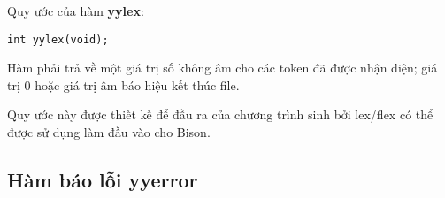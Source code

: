 \documentclass[../report.tex]{subfiles}
\begin{document}
Quy ước của hàm \textbf{yylex}:
\begin{lstlisting}
int yylex(void);
\end{lstlisting}
Hàm phải trả về một giá trị số không âm cho các token 
đã được nhận diện; giá trị 0 hoặc giá trị âm báo hiệu kết thúc file. 

Quy ước này được thiết kế để đầu ra của chương trình 
sinh bởi lex/flex có thể được sử dụng làm đầu vào cho Bison. 

\subsection{Hàm báo lỗi yyerror}
\end{document}

